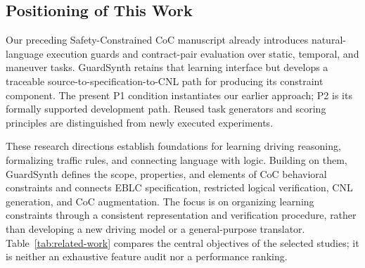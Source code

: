 \documentclass[nolineno]{ieeeaccess}
\begin{document}
\subsection{Positioning of This Work}

Our preceding Safety-Constrained CoC manuscript already introduces natural-language execution guards and contract-pair evaluation over static, temporal, and maneuver tasks. GuardSynth retains that learning interface but develops a traceable source-to-specification-to-CNL path for producing its constraint component. The present P1 condition instantiates our earlier approach; P2 is its formally supported development path. Reused task generators and scoring principles are distinguished from newly executed experiments. \cite{r4}\par

These research directions establish foundations for learning driving reasoning, formalizing traffic rules, and connecting language with logic. Building on them, GuardSynth defines the scope, properties, and elements of CoC behavioral constraints and connects EBLC specification, restricted logical verification, CNL generation, and CoC augmentation. The focus is on organizing learning constraints through a consistent representation and verification procedure, rather than developing a new driving model or a general-purpose translator. Table~\ref{tab:related-work} compares the central objectives of the selected studies; it is neither an exhaustive feature audit nor a performance ranking.\par
\end{document}
